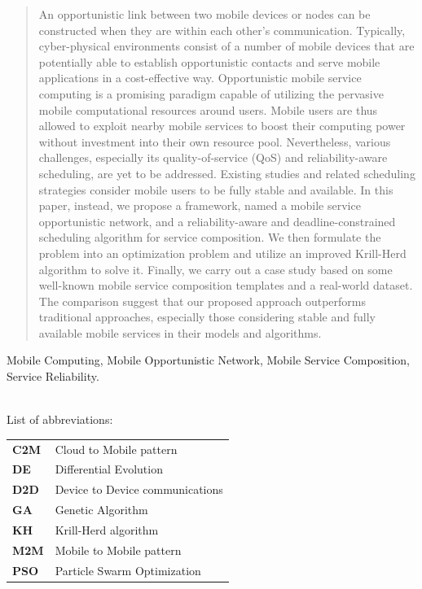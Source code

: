 \documentclass[journal]{IEEEtran}
\begin{document}
\begin{abstract}
An opportunistic link between two mobile devices or nodes can be constructed when they are within each other's communication. Typically, cyber-physical environments consist of a number of mobile devices that are potentially able to establish opportunistic contacts and serve mobile applications in a cost-effective way.
Opportunistic mobile service computing is a promising paradigm capable of utilizing the pervasive mobile computational resources around users. Mobile users are thus allowed to exploit nearby mobile services to boost their computing power without investment into their own resource pool. 
Nevertheless, various challenges, especially its quality-of-service (QoS) and reliability-aware scheduling, are yet to be addressed. Existing studies and related scheduling strategies consider mobile users to be fully stable and available.
In this paper, instead, we propose a framework, named a mobile service opportunistic network, and a reliability-aware and deadline-constrained scheduling algorithm for service composition. 
We then formulate the problem into an optimization problem and utilize an improved Krill-Herd algorithm to solve it.
Finally, we carry out a case study based on some well-known mobile service composition templates and a real-world dataset. The comparison suggest that our proposed approach outperforms traditional approaches, especially those considering stable and fully available mobile services in their models and algorithms.
\end{abstract}

\begin{IEEEkeywords}
Mobile Computing, Mobile Opportunistic Network, Mobile Service Composition, Service Reliability.
\end{IEEEkeywords}

~\\
\noindent List of abbreviations:
~\\

\noindent
\begin{tabular}{@{} l p{7.36cm} }
\textbf{C2M}   &   Cloud to Mobile pattern\\
\textbf{DE}    &   Differential Evolution \\
\textbf{D2D}   &   Device to Device communications \\
\textbf{GA}    &   Genetic Algorithm \\
\textbf{KH}    &   Krill-Herd algorithm \\
\textbf{M2M}   &   Mobile to Mobile pattern \\
\textbf{PSO}   &   Particle Swarm Optimization \\
\end{tabular}
\end{document}
